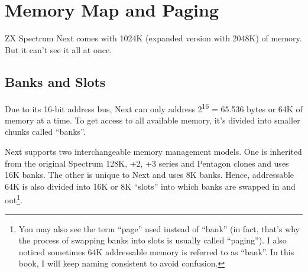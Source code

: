 \section{Memory Map and Paging}
\label{zx_next_memorypaging}


\newcommand{\MemEmpty}{\multicolumn{1}{c}{}}
\newcommand{\MemArrow}[1]{\multicolumn{1}{c}{\IfEq{#1}{<}{\LArrowLine{1em}}{\RArrowLine{1em}}}}

ZX Spectrum Next comes with 1024K (expanded version with 2048K) of memory. But it can't see it all at once.


\subsection{Banks and Slots}

Due to its 16-bit address bus, Next can only address 2\textsuperscript{16} = 65.536 bytes or 64K of memory at a time. To get access to all available memory, it's divided into smaller chunks called ``banks''.

Next supports two interchangeable memory management models. One is inherited from the original Spectrum 128K, +2, +3 series and Pentagon clones and uses 16K banks. The other is unique to Next and uses 8K banks. Hence, addressable 64K is also divided into 16K or 8K ``slots'' into which banks are swapped in and out\footnote{You may also see the term ``page'' used instead of ``bank'' (in fact, that's why the process of swapping banks into slots is usually called ``paging''). I also noticed sometimes 64K addressable memory is referred to as ``bank''. In this book, I will keep naming consistent to avoid confusion.}.

